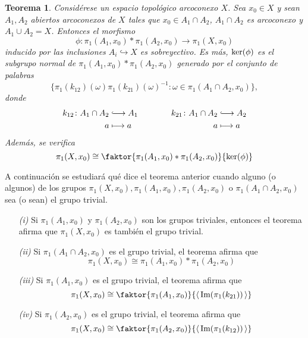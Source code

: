 \documentclass[11pt]{report}
\newtheorem*{theorem*}{Teorema} %
\theoremstyle{definition}
\theoremstyle{definition}
\theoremstyle{remark}
\begin{document}
\begin{theorem*}
Considérese un espacio topológico arcoconexo $X$. Sea $x_0 \in X$ y sean $A_1,A_2$ abiertos arcoconexos de $X$ tales que $x_0 \in A_1 \cap A_2$, $A_1 \cap A_2$ es arcoconexo y $A_1 \cup A_2 = X$. Entonces el morfismo
\[\phi \colon \pi_1(A_1,x_0) \ast \pi_1(A_2,x_0) \longrightarrow \pi_1(X,x_0)\]
inducido por las inclusiones $A_i \hookrightarrow X$ es sobreyectivo. Es más, $\textup{ker}(\phi)$ es el subgrupo normal de $\pi_1(A_1,x_0) \ast \pi_1(A_2,x_0)$ generado por el conjunto de palabras \[\{\pi_1(k_{12})(\omega) \pi_1(k_{21})(\omega)^{-1} \colon \omega \in \pi_1(A_1 \cap A_2,x_0)\},\]
donde
\[
\begin{aligned}[t]
k_{12} \colon A_1 \cap A_2 &\lhook\joinrel\longrightarrow A_1 \\
a &\longmapsto a
\end{aligned} \qquad \qquad
\begin{aligned}[t]
k_{21} \colon A_1 \cap A_2 &\lhook\joinrel\longrightarrow A_2 \\
a &\longmapsto a
\end{aligned}
\]
Además, se verifica
\[\pi_1(X,x_0) \cong \faktor{\pi_1(A_1,x_0) \ast \pi_1(A_2,x_0)}{\textup{ker}(\phi)}\]
\end{theorem*}

A continuación se estudiará qué dice el teorema anterior cuando alguno (o algunos) de los grupos $\pi_1(X,x_0), \pi_1(A_1,x_0), \pi_1(A_2,x_0)$ o $\pi_1(A_1 \cap A_2,x_0)$ sea (o sean) el grupo trivial.
\begin{itemize}
    \item[\textit{(i)}] Si $\pi_1(A_1,x_0)$ y $\pi_1(A_2,x_0)$ son los grupos triviales, entonces el teorema afirma que $\pi_1(X,x_0)$ es también el grupo trivial.
    \item[\textit{(ii)}] Si $\pi_1(A_1 \cap A_2,x_0)$ es el grupo trivial, el teorema afirma que \[\pi_1(X,x_0) \cong \pi_1(A_1,x_0) \ast \pi_1(A_2,x_0)\]
    \item[\textit{(iii)}] Si $\pi_1(A_1,x_0)$ es el grupo trivial, el teorema afirma que
    \[\pi_1(X,x_0) \cong \faktor{\pi_1(A_1,x_0)}{\langle \,\textup{Im}(\pi_1(k_{21})) \,\rangle}\]
    \item[\textit{(iv)}] Si $\pi_1(A_2,x_0)$ es el grupo trivial, el teorema afirma que
    \[\pi_1(X,x_0) \cong \faktor{\pi_1(A_2,x_0)}{\langle \,\textup{Im}(\pi_1(k_{12})) \,\rangle}\]
\end{itemize}
\end{document}
